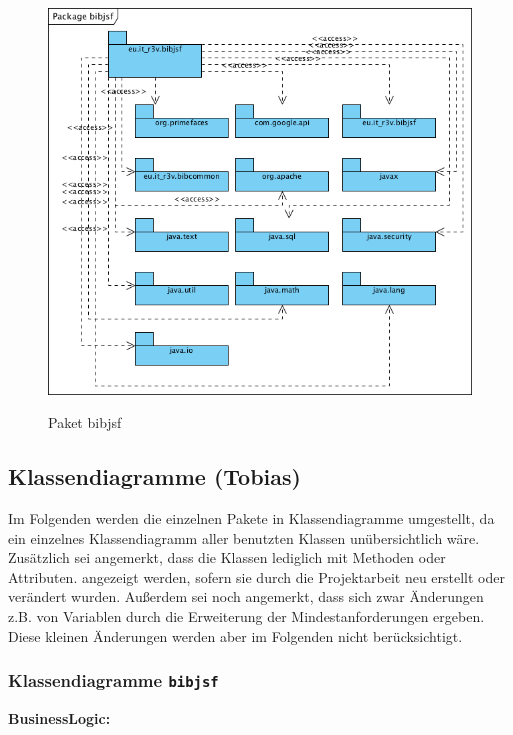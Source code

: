 \documentclass[fontsize=12pt,paper=a4,twoside]{scrartcl}
\begin{document}
\begin{figure} [H] 
\caption{Paket bibjsf} \centering
 \includegraphics[width=1\textwidth]{Diagramme/Packagebibjsf.png} 
 \label{pic:PackagebibjsfUebersicht} 
\end{figure}

\newpage

\subsection{Klassendiagramme (Tobias)}

Im Folgenden werden die einzelnen Pakete in Klassendiagramme umgestellt, da 
ein einzelnes Klassendiagramm aller benutzten Klassen unübersichtlich wäre.
Zusätzlich sei angemerkt, dass die Klassen lediglich mit Methoden oder Attributen.
angezeigt werden, sofern sie durch die Projektarbeit neu erstellt oder verändert wurden.
Außerdem sei noch angemerkt, dass sich zwar Änderungen z.B. von Variablen durch die Erweiterung der Mindestanforderungen ergeben. Diese kleinen Änderungen werden aber im Folgenden nicht berücksichtigt.
\newpage

\subsubsection{Klassendiagramme \texttt{bibjsf}}

\textbf{BusinessLogic:}
\end{document}
